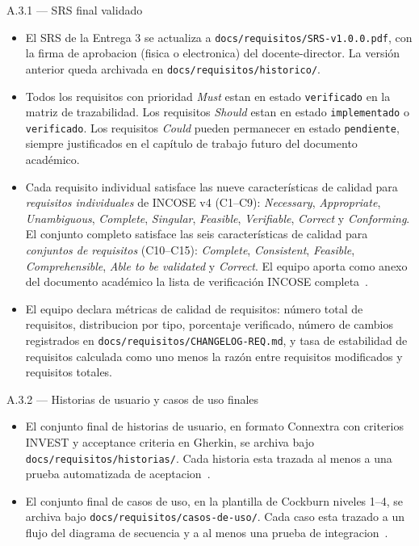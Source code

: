 \documentclass[11pt,a4paper]{article}
\begin{document}
\begin{cajaentregable}{A.3.1 --- SRS final validado}
    \begin{itemize}
        \item El SRS de la Entrega 3 se actualiza a \texttt{docs/requisitos/SRS-v1.0.0.pdf}, con la firma de aprobacion (fisica o electronica) del docente-director. La versi\'{o}n anterior queda archivada en \texttt{docs/requisitos/historico/}.
        \item Todos los requisitos con prioridad \emph{Must} estan en estado \texttt{verificado} en la matriz de trazabilidad. Los requisitos \emph{Should} estan en estado \texttt{implementado} o \texttt{verificado}. Los requisitos \emph{Could} pueden permanecer en estado \texttt{pendiente}, siempre justificados en el cap\'{i}tulo de trabajo futuro del documento acad\'{e}mico.
        \item Cada requisito individual satisface las nueve caracter\'{i}sticas de calidad para \emph{requisitos individuales} de INCOSE v4 (C1--C9): \emph{Necessary}, \emph{Appropriate}, \emph{Unambiguous}, \emph{Complete}, \emph{Singular}, \emph{Feasible}, \emph{Verifiable}, \emph{Correct} y \emph{Conforming}. El conjunto completo satisface las seis caracter\'{i}sticas de calidad para \emph{conjuntos de requisitos} (C10--C15): \emph{Complete}, \emph{Consistent}, \emph{Feasible}, \emph{Comprehensible}, \emph{Able to be validated} y \emph{Correct}. El equipo aporta como anexo del documento acad\'{e}mico la lista de verificaci\'{o}n INCOSE completa~\cite{incose2023requirements}.
        \item El equipo declara m\'{e}tricas de calidad de requisitos: n\'{u}mero total de requisitos, distribucion por tipo, porcentaje verificado, n\'{u}mero de cambios registrados en \texttt{docs/requisitos/CHANGELOG-REQ.md}, y tasa de estabilidad de requisitos calculada como uno menos la raz\'{o}n entre requisitos modificados y requisitos totales.
    \end{itemize}
\end{cajaentregable}

\begin{cajaentregable}{A.3.2 --- Historias de usuario y casos de uso finales}
    \begin{itemize}
        \item El conjunto final de historias de usuario, en formato Connextra con criterios INVEST y acceptance criteria en Gherkin, se archiva bajo \texttt{docs/requisitos/historias/}. Cada historia esta trazada al menos a una prueba automatizada de aceptacion~\cite{cohn2004user}.
        \item El conjunto final de casos de uso, en la plantilla de Cockburn niveles 1--4, se archiva bajo \texttt{docs/requisitos/casos-de-uso/}. Cada caso esta trazado a un flujo del diagrama de secuencia y a al menos una prueba de integracion~\cite{cockburn2001writing}.
    \end{itemize}
\end{cajaentregable}
\end{document}
